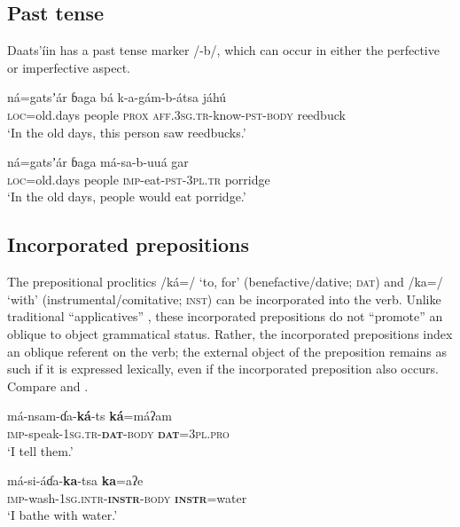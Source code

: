 \documentclass[output=paper]{langsci/langscibook}
\begin{document}
\subsection{Past tense}\label{sec:ahlandc:4.4}

Daats’\'{i}in has a past tense marker /-b/, which can occur in either the perfective  or imperfective  aspect.

\ea\label{ex:ahlandc:21}
\gll
n\'{a}=gatsʼ\'{a}r       ɓaga      b\'{a}  k-a-g\'{a}m-b-\'{a}tsa   j\'{a}hú \\
\textsc{loc}=old.days  people   \textsc{prox}   \textsc{aff.3sg.tr}{}-know-\textsc{pst-body}  reedbuck \\
\glt
‘In the old days, this person saw reedbucks.’
\z

\ea\label{ex:ahlandc:22}
\gll
n\'{a}=gatsʼ\'{a}r       ɓaga    m\'{a}-sa-b-uu\'{a}  gar \\
\textsc{loc}=old.days   people \textsc{imp}{}-eat-\textsc{pst}{}-\textsc{3pl.tr}  porridge \\
\glt
‘In the old days, people would eat porridge.’
\z


\subsection{Incorporated prepositions}\label{sec:ahlandc:4.5}

The prepositional proclitics /k\'{a}=/ ‘to, for’ (benefactive/dative; \textsc{dat}) and /ka=/ ‘with’ (instrumental/comitative; \textsc{inst}) can be incorporated into the verb. Unlike traditional “applicatives” \citep{Payne1997}, these incorporated prepositions do not “promote” an oblique to object grammatical status. Rather, the incorporated prepositions index an oblique referent on the verb; the external object of the preposition remains as such if it is expressed lexically, even if the incorporated preposition also occurs. Compare  and . 

\ea\label{ex:ahlandc:23}
\gll
m\'{a}-nsam-ɗa-\textbf{k\'{a}}{}-ts                      \textbf{k\'{a}}=m\'{a}ʔam \\
\textsc{imp}{}-speak-\textsc{1sg.tr-}\textbf{\textsc{dat}}\textsc{{}-body} \textbf{\textsc{dat}}\textsc{=3pl.pro} \\
\glt
‘I tell them.’
\z

\ea\label{ex:ahlandc:24}
\gll
m\'{a}-si-\'{a}ɗa-\textbf{ka}{}-tsa    \textbf{ka}=aʔe \\
\textsc{imp}{}-wash-\textsc{1sg.intr-}\textbf{\textsc{instr}}\textsc{{}-body} \textbf{\textsc{instr}}\textsc{=}water   \\
\glt
‘I bathe with water.’
\z
\end{document}
